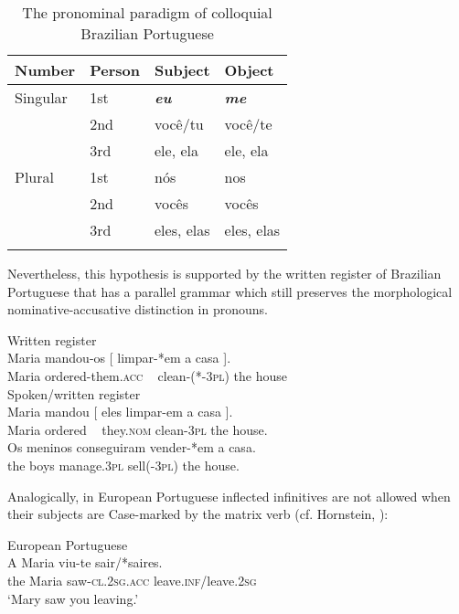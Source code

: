 \documentclass[output=paper]{langsci/langscibook}
\begin{document}
\begin{table}
\caption{\label{tab:moreno:1}The pronominal paradigm of colloquial Brazilian Portuguese}
\begin{tabular}{llll}
\lsptoprule
{Number}   & Person & Subject & Object\\\midrule
{Singular} & 1st & \textbf{\textit{eu}} & \textbf{\textit{me}}\\
           & 2nd & você/tu & você/te\\
           & 3rd & ele, ela & ele, ela\\\midrule
{Plural}   & 1st & nós & nos\\
           & 2nd & vocês & vocês\\
           & 3rd & eles, elas & eles, elas\\
\lspbottomrule
\end{tabular}
\end{table}

Nevertheless, this hypothesis is supported by the written register of Brazilian Portuguese that has a parallel grammar which still preserves the morphological nominative-accusative distinction in pronouns.

\ea%
    \label{ex:moreno:24}
    \ea  Written register\\
    \gll Maria mandou-os     [  limpar-*em    a    casa ].   \\
         Maria ordered-them.\textsc{acc}   ~    clean-(*-\textsc{3pl}) the house\\
    \ex  Spoken/written register\\
    \gll Maria mandou [ eles   limpar-em a    casa ].   \\
         Maria ordered  ~  they.\textsc{nom} clean-\textsc{3pl}  the house. \\
    \ex  
    \gll Os meninos conseguiram  vender-*em  a    casa. \\
         the boys      manage.\textsc{3pl}    sell(-\textsc{3pl})     the house. \\
\z
\z

Analogically, in European Portuguese inflected infinitives are not allowed when their subjects are Case-marked by the matrix verb (cf. Hornstein, \citealt{Martins2008}):

\ea%
         European Portuguese\label{ex:moreno:25}\\
    \gll A   Maria viu-te           sair/*saires.\\
         the Maria saw-\textsc{cl.2sg.acc} leave.\textsc{inf}/leave.\textsc{2sg}\\
    \glt ‘Mary saw you leaving.’
\z
\end{document}
